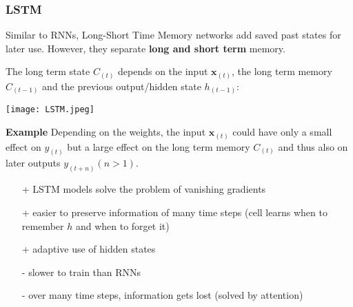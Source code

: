 \subsubsection{LSTM}
Similar to RNNs, Long-Short Time Memory networks add saved past states for later use. However, they separate \textbf{long and short term} memory.

The long term state $C_{(t)}$ depends on the input $\mathbf{x}_{(t)}$, the long term memory $C_{(t-1)}$ and the previous output/hidden state $h_{(t-1)}$:
\begin{center}
    \texttt{[image: LSTM.jpeg]}
\end{center}

\textbf{Example}
Depending on the weights, the input $\mathbf{x}_{(t)}$ could have only a small effect on $y_{(t)}$ but a large effect on the long term memory $C_{(t)}$ and thus also on later outputs $y_{(t+n)} (n>1)$.

\newpar{}
\begin{itemize}
    \item [+] LSTM models solve the problem of vanishing gradients
    \item [+] easier to preserve information of many time steps (cell learns when to remember $h$ and when to forget it)
    \item [+] adaptive use of hidden states
    \item [-] slower to train than RNNs
    \item [-] over many time steps, information gets lost (solved by attention)
\end{itemize}
